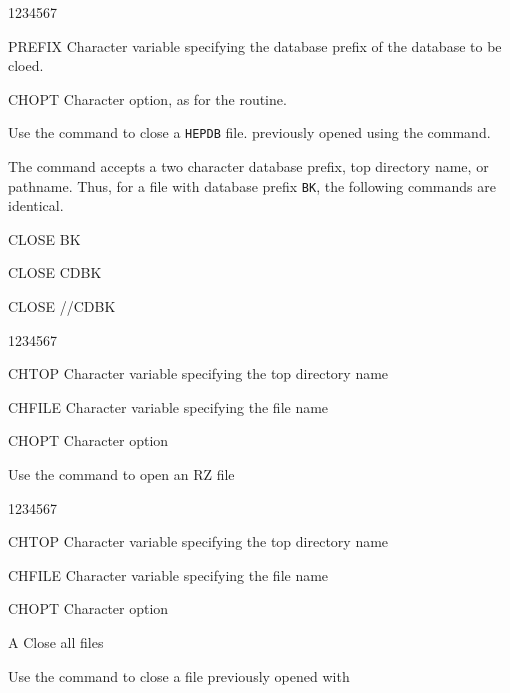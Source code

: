 
\begin{DLtt}{1234567}
\item[PREFIX]Character variable specifying the database prefix
of the database to be cloed.
\item[CHOPT]Character option, as for the  routine.
\end{DLtt}

Use the  command to close a {\tt HEPDB} file.
previously opened using the  command.

The  command accepts a two character database
prefix, top directory name, or pathname. Thus, for a file
with database prefix {\tt BK}, the following commands
are identical.

\begin{XMP}

CLOSE BK

CLOSE CDBK

CLOSE //CDBK

\end{XMP}


\begin{DLtt}{1234567}
\item[CHTOP]Character variable specifying the top directory name
\item[CHFILE]Character variable specifying the file name
\item[CHOPT]Character option
\end{DLtt}

Use the  command to open an RZ file


\begin{DLtt}{1234567}
\item[CHTOP]Character variable specifying the top directory name
\item[CHFILE]Character variable specifying the file name
\item[CHOPT]Character option
  \begin{DLtt}{1}
    \item[A]Close all files
  \end{DLtt}
\end{DLtt}

Use the  command to close a file previously opened with


